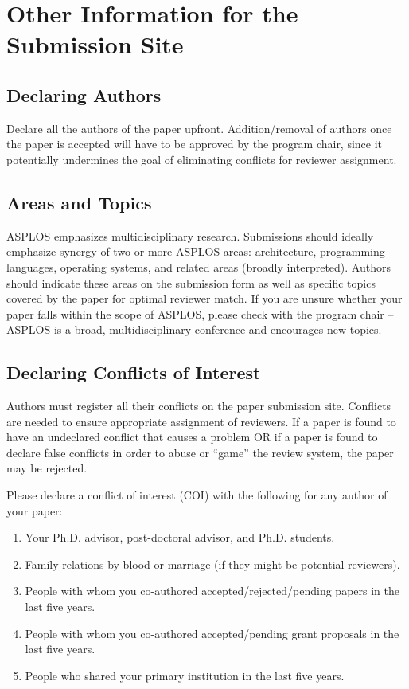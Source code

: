 \documentclass[pageno]{jpaper}
\begin{document}
\section{Other Information for the Submission Site}

\subsection{Declaring Authors}

Declare all the authors of the paper upfront. Addition/removal of authors
once the paper is accepted will have to be approved by the program chair,
since it potentially undermines the goal of eliminating conflicts for
reviewer assignment.

\subsection{Areas and Topics}

ASPLOS emphasizes multidisciplinary research. Submissions should ideally
emphasize synergy of two or more ASPLOS areas: architecture, programming
languages, operating systems, and related areas (broadly
interpreted). Authors should indicate these areas on the submission form as
well as specific topics covered by the paper for optimal reviewer match. If
you are unsure whether your paper falls within the scope of ASPLOS, please
check with the program chair -- ASPLOS is a broad, multidisciplinary
conference and encourages new topics.

\subsection{Declaring Conflicts of Interest}

Authors must register all their conflicts on the paper submission site.
Conflicts are needed to ensure appropriate assignment of reviewers.  
If a paper is found to have an undeclared conflict that causes
a problem OR if a paper is found to declare false conflicts in order to
abuse or ``game'' the review system, the paper may be rejected.

Please declare a conflict of interest (COI) with the following 
for any author of your paper:

\begin{enumerate}
\item Your Ph.D. advisor, post-doctoral advisor, and Ph.D. students.
\item Family relations by blood or marriage (if they might be potential reviewers).
\item People with whom you co-authored accepted/rejected/pending papers in the last five years.
\item People with whom you co-authored accepted/pending grant proposals
  in the last five years.
\item People who shared your primary institution in the last five years. 
\end{enumerate}
\end{document}
